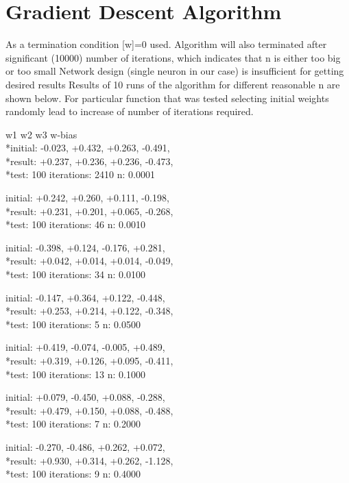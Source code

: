 \section{Gradient Descent Algorithm}

As a termination condition [w]=0 used. Algorithm will also terminated after significant (10000) number of iterations, which indicates that
	n is either too big or too small
	Network design (single neuron in our case) is insufficient for getting desired results
Results of 10 runs of the algorithm for different reasonable n are shown below. For particular function that was tested selecting initial weights randomly lead to increase of number of iterations required.

\hspace{15 mm} w1 \hspace{5 mm} w2 \hspace{5 mm}w3 \hspace{5 mm} w-bias 
\\*initial: -0.023, +0.432, +0.263, -0.491, 
\\*result:  +0.237, +0.236, +0.236, -0.473, 
\\*test: 100  iterations: 2410	n: 0.0001

initial: +0.242, +0.260, +0.111, -0.198, 
\\*result:  +0.231, +0.201, +0.065, -0.268, 
\\*test: 100  iterations: 46	n: 0.0010

initial: -0.398, +0.124, -0.176, +0.281, 
\\*result:  +0.042, +0.014, +0.014, -0.049, 
\\*test: 100  iterations: 34	n: 0.0100

initial: -0.147, +0.364, +0.122, -0.448, 
\\*result:  +0.253, +0.214, +0.122, -0.348, 
\\*test: 100  iterations: 5	n: 0.0500

initial: +0.419, -0.074, -0.005, +0.489, 
\\*result:  +0.319, +0.126, +0.095, -0.411, 
\\*test: 100  iterations: 13	n: 0.1000

initial: +0.079, -0.450, +0.088, -0.288, 
\\*result:  +0.479, +0.150, +0.088, -0.488, 
\\*test: 100  iterations: 7	n: 0.2000

initial: -0.270, -0.486, +0.262, +0.072, 
\\*result:  +0.930, +0.314, +0.262, -1.128, 
\\*test: 100  iterations: 9	n: 0.4000

